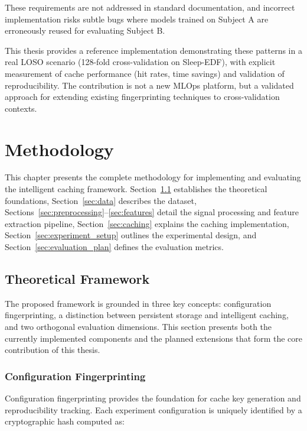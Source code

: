 \documentclass{imc-inf} %
\begin{document}
These requirements are not addressed in standard documentation, and incorrect 
implementation risks subtle bugs where models trained on Subject A are 
erroneously reused for evaluating Subject B.

This thesis provides a reference implementation demonstrating these patterns 
in a real LOSO scenario (128-fold cross-validation on Sleep-EDF), with 
explicit measurement of cache performance (hit rates, time savings) and 
validation of reproducibility. The contribution is not a new MLOps platform, 
but a validated approach for extending existing fingerprinting 
techniques to cross-validation contexts.

\chapter{Methodology}

This chapter presents the complete methodology for implementing and evaluating the intelligent caching framework. Section~\ref{sec:theoretical} establishes the theoretical foundations, Section~\ref{sec:data} describes the dataset, Sections~\ref{sec:preprocessing}--\ref{sec:features} detail the signal processing and feature extraction pipeline, Section~\ref{sec:caching} explains the caching implementation, Section~\ref{sec:experiment_setup} outlines the experimental design, and Section~\ref{sec:evaluation_plan} defines the evaluation metrics.

\section{Theoretical Framework}
\label{sec:theoretical}

The proposed framework is grounded in three key concepts: configuration fingerprinting, a distinction between persistent storage and intelligent caching, and two orthogonal evaluation dimensions. This section presents both the currently implemented components and the planned extensions that form the core contribution of this thesis.

\subsection{Configuration Fingerprinting}

Configuration fingerprinting provides the foundation for cache key generation and reproducibility tracking. Each experiment configuration is uniquely identified by a cryptographic hash computed as:
\end{document}
